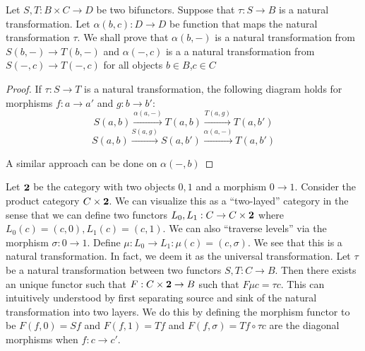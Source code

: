 \documentclass[12pt]{article}
\begin{document}
Let $S,T:B \times C \rightarrow D$ be two bifunctors. Suppose that $\tau: S \rightarrow B$ is a natural transformation. Let $\alpha(b,c): D \rightarrow D$ be function that maps the natural transformation $\tau$.  We shall prove that $\alpha(b,-)$ is a natural transformation from $S(b,-) \rightarrow T(b,-)$ and $\alpha(-,c)$ is a a natural transformation from $S(-,c) \rightarrow T(-,c)$ for all objects $b \in B$,$c \in C$
\begin{proof}
 If $\tau: S \rightarrow T$ is a natural transformation, the following diagram holds for morphisms $f:a \rightarrow a'$ and $g:b \rightarrow b'$:
 $$  S(a,b) \xrightarrow{\alpha(a,-)} T(a,b) \xrightarrow{T(a,g)} T(a,b') $$
 $$  S(a,b) \xrightarrow{S(a,g)} S(a,b') \xrightarrow{\alpha(a,-)} T(a,b') $$
 
 A similar approach can be done on $\alpha(-,b)$ 
\end{proof}

Let ${\bf 2}$ be the category with two objects $0,1$ and a morphism $0 \rightarrow 1$. Consider the product category $C \times {\bf 2}$. We can visualize this as a ``two-layed'' category in the sense that we can define two functors $L_0,L_1: C \rightarrow C \times {\bf 2}$ where $L_0(c) = (c,0), L_1(c) = (c,1)$. We can also ``traverse levels'' via the morphism $\sigma: 0 \rightarrow 1$. Define $\mu: L_0 \rightarrow L_1:
\mu(c) = (c,\sigma)$. We see that this is a natural transformation. In fact, we deem it as the universal transformation. Let $\tau$ be a natural transformation between two functors $S,T: C \rightarrow B$. Then there exists an unique functor such that $F: C \times {\bf 2} \rightarrow B$ such that $F\mu c = \tau c$. This can intuitively understood by first separating source and sink of the natural transformation into two layers. We do this by defining the morphism functor to be $F(f,0) = Sf$ and $F(f,1) = Tf$ and $F(f,\sigma) = Tf \circ \tau c$ are the diagonal morphisms when $f: c \rightarrow c'$.
\end{document}
